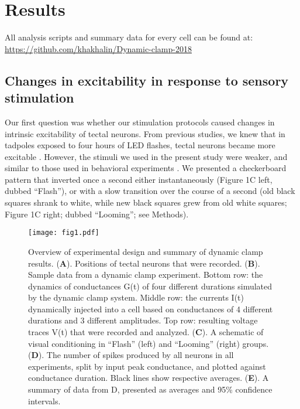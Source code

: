\documentclass{article}
\begin{document}
\section*{Results}

All analysis scripts and summary data for every cell can be found at:  \url{https://github.com/khakhalin/Dynamic-clamp-2018}

\subsection*{Changes in excitability in response to sensory stimulation}

Our first question was whether our stimulation protocols caused changes in intrinsic excitability of tectal neurons. From previous studies, we knew that in tadpoles exposed to four hours of LED flashes, tectal neurons became more excitable \citep{aizenman2003,ciarleglio2015}. However, the stimuli we used in the present study were weaker, and similar to those used in behavioral experiments \citep{khakhalin2014,james2015,truszkowski2017}. We presented a checkerboard pattern that inverted once a second either instantaneously (Figure 1C left, dubbed “Flash”), or with a slow transition over the course of a second (old black squares shrank to white, while new black squares grew from old white squares; Figure 1C right; dubbed “Looming”; see Methods).

\begin{figure*}
\texttt{[image: fig1.pdf]}
\caption{
Overview of experimental design and summary of dynamic clamp results. (\textbf{A}). Positions of tectal neurons that were recorded. (\textbf{B}). Sample data from a dynamic clamp experiment. Bottom row: the dynamics of conductances G(t) of four different durations simulated by the dynamic clamp system. Middle row: the currents I(t) dynamically injected into a cell based on conductances of 4 different durations and 3 different amplitudes. Top row: resulting voltage traces V(t) that were recorded and analyzed. (\textbf{C}). A schematic of visual conditioning in “Flash” (left) and “Looming” (right) groups. (\textbf{D}). The number of spikes produced by all neurons in all experiments, split by input peak conductance, and plotted against conductance duration. Black lines show respective averages. (\textbf{E}). A summary of data from D, presented as averages and 95\% confidence intervals.}
\end{figure*}
\end{document}

